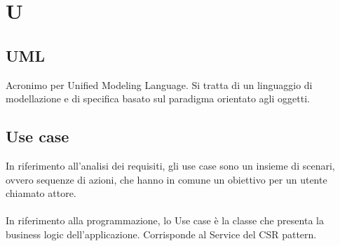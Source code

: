 \chapter{U}
\section{UML}\label{sec:Unified Modeling Language}
Acronimo per Unified Modeling Language. Si tratta di un linguaggio di modellazione e di specifica basato sul paradigma orientato agli oggetti.

\section{Use case}\label{sec:Use Cases}
In riferimento all'analisi dei requisiti, gli use case sono un insieme di scenari, ovvero sequenze di azioni, che hanno in comune un obiettivo per un utente chiamato attore.\\ \\
In riferimento alla programmazione, lo Use case è la classe che presenta la business logic dell'applicazione. Corrisponde al Service del CSR pattern.
